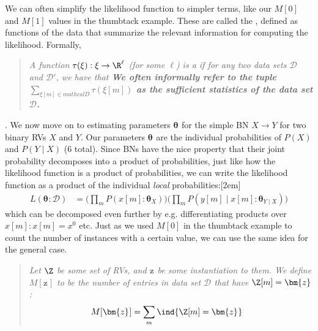 \documentclass[11pt]{article}
\renewcommand\vec[2][]{\bm{#2}_{#1}}
\newcommand\myspace[1][]{\vspace{#1\bigskipamount}}
\newcommand\p{\Needspace{10\baselineskip} \noindent}
\begin{document}
\p We can often simplify the likelihood function to simpler terms, like our $M[0]$ and $M[1]$ values in the thumbtack example. These are called the , defined as functions of the data that summarize the relevant information for computing the likelihood. Formally,
\vspace{-0.5em}
\begin{quote}
	{\small\itshape 
		A function $\tau(\xi) : \xi \rightarrow \R^{\ell}$ (for some $\ell$) is a  if for any two data sets $\mathcal D$ and $\mathcal{D}'$, we have that
		\graybox{
			\bigg[ \sum_{ \xi[m] \in \mathcal D } \tau(\xi[m])	 = \sum_{ \xi'[m] \in \mathcal D' } \tau(\xi'[m]) \bigg]
			\implies 
			\bigg[ L(\vec{\theta} : \mathcal D) = L(\vec{\theta} : \mathcal D')    \bigg]
		} 
		\textbf{We often informally refer to the tuple $\sum_{\xi[m] \in mathcal D} \tau(\xi[m])$ as the sufficient statistics of the data set $\mathcal D$.}
	}
\end{quote}

\myspace
\p {}. We now move on to estimating parameters $\vec{\theta}$ for the simple BN $X \rightarrow Y$ for two binary RVs $X$ and $Y$. Our parameters $\vec{\theta}$ are the individual probabilities of $P(X)$ and $P(Y \mid X)$ (6 total). Since BNs have the nice property that their joint probability decomposes into a product of probabilities, just like how the likelihood function is a product of probabilities, we can write the likelihood function as a product of the individual \textit{local} probabilities:[2em]
\begin{align}
	L(\vec{\theta} : \mathcal D) &= \bigg( \prod_m P(x[m] : \vec[X]{\theta})  \bigg) \bigg( \prod_m P(y[m] \mid x[m] : \vec[Y \mid X]{\theta}) \bigg)
\end{align}
which can be decomposed even further by e.g. differentiating products over $x[m]:x[m]=x^0$ etc. Just as we used $M[0]$ in the thumbtack example to count the number of instances with a certain value, we can use the same idea for the general case. 
\vspace{-0.5em}%
\begin{quote}
	{\small\itshape
		Let $\Z$ be some set of RVs, and $\vec{z}$ be some instantiation to them. We define $M[\vec{z}]$ to be the number of entries in data set $\mathcal D$ that have $\Z[m] = \vec{z}$:
		\begin{align}
			M[\vec z] &= \sum_m \ind\{\Z[m] = \vec z \}
		\end{align}
	}
\end{quote}
\end{document}
